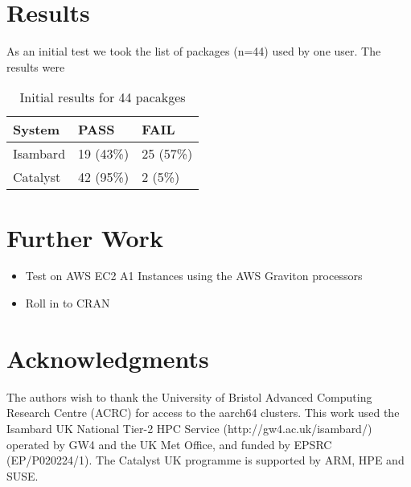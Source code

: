 \documentclass{article}
\begin{document}
\section{Results}

As an initial test we took the list of packages (n=44) used by one user. The results were 

\begin{table}[h]
\begin{tabular}{lll}
\hline
System & PASS & FAIL \\ \hline
Isambard & 19 (43\%) & 25 (57\%) \\
Catalyst & 42 (95\%) & 2 (5\%) \\ \hline
\end{tabular}
\caption{Initial results for 44 pacakges}
\label{tab:results-one-user}
\end{table}

\section{Further Work}

\begin{itemize}
    \item Test on AWS EC2 A1 Instances using the AWS Graviton processors
    \item Roll in to CRAN 
\end{itemize}

\section{Acknowledgments}

The authors wish to thank the University of Bristol Advanced Computing Research Centre (\textsc{ACRC}) for access to the aarch64 clusters. This work used the Isambard UK National Tier-2 HPC Service (http://gw4.ac.uk/isambard/) operated by GW4 and the UK Met Office, and funded by EPSRC (EP/P020224/1). The Catalyst UK programme is supported by ARM, HPE and SUSE.

\printbibliography
\end{document}
